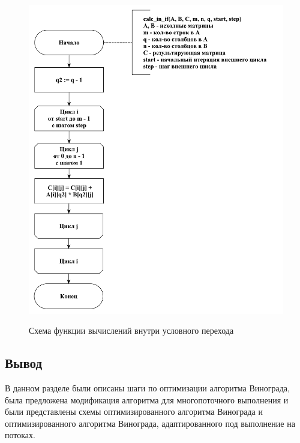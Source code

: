 \documentclass[a4paper,12pt]{article}
\begin{document}
	    
	    	    \begin{figure}[h!]
	    	\begin{center}
	    		{\includegraphics[scale = 0.5]{schema05.pdf}}
	    		\caption{Схема функции вычислений внутри условного перехода}
	    		\label{fig:schema_in_if}
	    	\end{center}
	    \end{figure}
	    
	\newpage
	\mbox{}
	\newpage
	\mbox{}
	\newpage
	\mbox{}
	\newpage
	\mbox{}
	\newpage
	    
	    
	\subsection*{Вывод}
		В данном разделе были описаны шаги по оптимизации алгоритма Винограда, была предложена модификация алгоритма для многопоточного выполнения и были представлены схемы оптимизированного алгоритма Винограда и оптимизированного алгоритма Винограда, адаптированного под выполнение на потоках.
\end{document}

